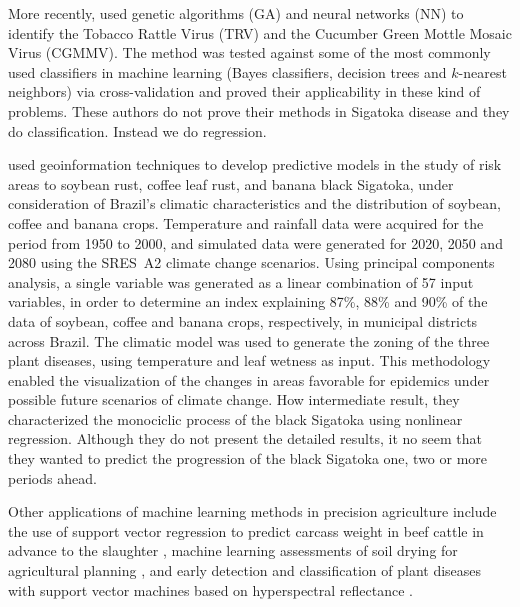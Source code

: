 More recently, \citet{Glezakos2010} used genetic algorithms (GA) and
neural networks (NN) to identify the Tobacco Rattle Virus (TRV) and
the Cucumber Green Mottle Mosaic Virus (CGMMV).
%
The method was tested against some of the most commonly used
classifiers in machine learning (Bayes classifiers, decision trees and
$k$-nearest neighbors) via cross-validation and proved their
applicability in these kind of problems.
%
These authors do not prove their methods in Sigatoka disease and they do classification. Instead we do regression.

\citet{Alves2011} used geoinformation techniques to
develop predictive models in the study of risk areas to soybean rust,
coffee leaf rust, and banana black Sigatoka, under consideration of
Brazil’s climatic characteristics and the distribution of soybean,
coffee and banana crops.
%
Temperature and rainfall data were acquired for the period from 1950
to 2000, and simulated data were generated for 2020, 2050 and 2080
using the SRES~A2 climate change scenarios.
%
Using principal components analysis, a single variable was generated
as a linear combination of 57 input variables, in order to determine
an index explaining 87\%, 88\% and 90\% of the data
%
%
of soybean, coffee and
banana crops, respectively, in municipal districts across Brazil.
%
The climatic model was used to generate the zoning of the three plant
diseases, using temperature and leaf wetness as input.
%
%
This methodology enabled the visualization of the changes in areas
favorable for epidemics under possible future scenarios of climate
change.
%
How intermediate result, they characterized the monociclic process of the black Sigatoka using  nonlinear regression. Although they do not present the detailed results, it no seem that they wanted to predict the progression of the black Sigatoka one, two or more periods ahead.

Other applications of machine learning methods in precision
agriculture include the use of support vector regression to predict
carcass weight in beef cattle in advance to the slaughter
\citep{Alonso2013}, machine learning assessments of soil drying for
agricultural planning \citep{Coopersmith2014}, and early detection and
classification of plant diseases with support vector machines based on
hyperspectral reflectance \citep{Rumpf2010}.

